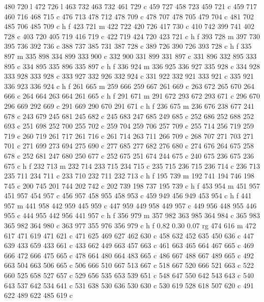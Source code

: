 {{   480 720 l
   472 726 l
   463 732 463 732 461 729 c
   459 727 458 723 459 721 c
   459 717 460 716 468 715 c
   476 713 478 712 478 709 c
   478 707 478 705 479 704 c
   481 702 485 706 485 709 c
   h f
   423 721 m
   422 722 420 726 417 730 c
   410 742 399 741 402 728 c
   403 720 405 719 416 719 c
   422 719 424 720 423 721 c
   h f
   393 728 m
   397 730 395 736 392 736 c
   388 737 385 731 387 728 c
   389 726 390 726 393 728 c
   h f
   335 897 m
   335 898 334 899 333 900 c
   332 900 331 899 331 897 c
   331 896 332 895 333 895 c
   334 895 335 896 335 897 c
   h f
   336 924 m
   336 925 336 927 335 928 c
   334 928 333 928 333 928 c
   333 927 332 926 332 924 c
   331 922 332 921 333 921 c
   335 921 336 923 336 924 c
   h f
   261 665 m
   259 666 259 667 261 669 c
   263 672 265 670 264 666 c
   264 664 263 664 261 665 c
   h f
   291 671 m
   291 672 293 672 293 671 c
   296 670 296 669 292 669 c
   291 669 290 670 291 671 c
   h f
   236 675 m
   236 676 238 677 241 678 c
   243 679 245 681 245 682 c
   245 683 247 685 249 685 c
   252 686 252 688 252 693 c
   251 698 252 700 255 702 c
   259 704 259 706 257 709 c
   255 714 256 719 259 719 c
   260 719 261 717 261 716 c
   261 714 263 711 266 709 c
   268 707 271 703 271 701 c
   271 699 273 694 275 690 c
   277 685 277 682 276 680 c
   274 676 264 675 258 678 c
   252 681 247 680 250 677 c
   252 675 251 674 244 675 c
   240 675 236 675 236 675 c
   h f
   232 713 m
   232 714 233 715 234 715 c
   235 715 236 715 236 714 c
   236 713 235 711 234 711 c
   233 710 232 711 232 713 c
   h f
   195 739 m
   192 741 194 746 198 745 c
   200 745 201 744 202 742 c
   202 739 198 737 195 739 c
   h f
   453 954 m
   451 957 451 957 454 957 c
   456 957 458 955 458 953 c
   459 949 456 949 453 954 c
   h f
   441 957 m
   441 958 442 959 445 959 c
   447 959 449 958 449 957 c
   449 956 448 955 446 955 c
   444 955 442 956 441 957 c
   h f
   356 979 m
   357 982 363 985 364 984 c
   365 983 365 982 364 980 c
   363 977 355 976 356 979 c
   h f
   0.82 0.30 0.07 rg
   474 616 m
   472 617 471 619 471 621 c
   471 625 469 627 462 630 c
   458 632 452 635 450 636 c
   447 639 433 659 433 661 c
   433 662 449 663 457 663 c
   461 663 465 664 467 665 c
   469 666 472 666 475 665 c
   478 664 480 664 483 665 c
   486 667 488 667 489 665 c
   492 663 504 663 506 665 c
   506 666 510 667 513 667 c
   518 667 520 666 521 663 c
   522 660 525 658 527 657 c
   529 656 535 653 539 651 c
   548 647 550 642 543 643 c
   540 643 537 642 534 641 c
   531 638 530 636 530 630 c
   530 619 528 618 507 620 c
   491 622 489 622 485 619 c
}}
